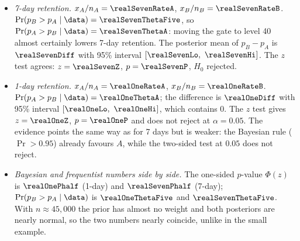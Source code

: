\begin{itemize}[nosep]
\item \emph{7-day retention.} $x_A/n_A=\realSevenRateA$, $x_B/n_B=\realSevenRateB$.
  $\Pr(p_B>p_A\mid\data)=\realSevenThetaFive$, so $\Pr(p_A>p_B\mid\data)=\realSevenThetaA$: moving the gate to level 40
  almost certainly lowers 7-day retention. The posterior mean of $p_B-p_A$ is $\realSevenDiff$ with 95\% interval
  $[\realSevenLo,\ \realSevenHi]$. The $z$ test agrees: $z=\realSevenZ$, $p=\realSevenP$, $H_0$ rejected.
\item \emph{1-day retention.} $x_A/n_A=\realOneRateA$, $x_B/n_B=\realOneRateB$.
  $\Pr(p_A>p_B\mid\data)=\realOneThetaA$; the difference is $\realOneDiff$ with 95\% interval $[\realOneLo,\ \realOneHi]$,
  which contains $0$. The $z$ test gives $z=\realOneZ$, $p=\realOneP$ and does not reject at $\alpha=0.05$.
  The evidence points the same way as for 7 days but is weaker: the Bayesian rule ($\Pr>0.95$) already favours
  $A$, while the two-sided test at $0.05$ does not reject.
\item \emph{Bayesian and frequentist numbers side by side.} The one-sided $p$-value $\Phi(z)$ is $\realOnePhalf$ (1-day)
  and $\realSevenPhalf$ (7-day); $\Pr(p_B>p_A\mid\data)$ is $\realOneThetaFive$ and $\realSevenThetaFive$. With
  $n\approx45{,}000$ the prior has almost no weight and both posteriors are nearly normal, so the two numbers nearly
  coincide, unlike in the small example.
\end{itemize}

